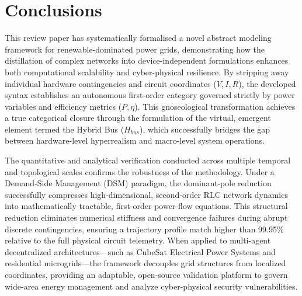 \documentclass[energies,accept,oneauthor,pdftex]{Definitions/mdpi}
\begin{document}



\section{Conclusions}\label{sec:conclusions}

This review paper has systematically formalised a novel abstract modeling framework for renewable-dominated power grids, demonstrating how the distillation of complex networks into device-independent formulations enhances both computational scalability and cyber-physical resilience. By stripping away individual hardware contingencies and circuit coordinates ($V, I, R$), the developed syntax establishes an autonomous first-order category governed strictly by power variables and efficiency metrics ($P, \eta$). This gnoseological transformation achieves a true categorical closure through the formulation of the virtual, emergent element termed the Hybrid Bus ($H_{bus}$), which successfully bridges the gap between hardware-level hyperrealism and macro-level system operations.


The quantitative and analytical verification conducted across multiple temporal and topological scales confirms the robustness of the methodology. Under a Demand-Side Management (DSM) paradigm, the dominant-pole reduction successfully compresses high-dimensional, second-order RLC network dynamics into mathematically tractable, first-order power-flow equations. This structural reduction eliminates numerical stiffness and convergence failures during abrupt discrete contingencies, ensuring a trajectory profile match higher than 99.95\% relative to the full physical circuit telemetry. When applied to multi-agent decentralized architectures—such as CubeSat Electrical Power Systems and residential microgrids—the framework decouples grid structures from localized coordinates, providing an adaptable, open-source validation platform to govern wide-area energy management and analyze cyber-physical security vulnerabilities.
\end{document}
